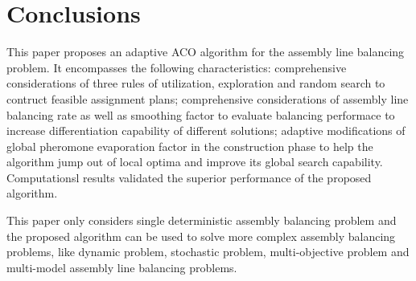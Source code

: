 \section{Conclusions}
This paper proposes an adaptive ACO algorithm for the assembly line balancing problem.
It encompasses the following characteristics: comprehensive considerations of three rules of utilization, exploration and random search to contruct feasible assignment plans; comprehensive considerations of assembly line balancing rate as well as smoothing factor to evaluate balancing performace to increase differentiation capability of different solutions; adaptive modifications of global pheromone evaporation factor in the construction phase to help the algorithm jump out of local optima and improve its global search capability. 
Computationsl results validated the superior performance of the proposed algorithm.

This paper only considers single deterministic assembly balancing problem and the proposed algorithm can be used to solve more complex assembly balancing problems, like dynamic problem, stochastic problem, multi-objective problem and multi-model assembly line balancing problems.